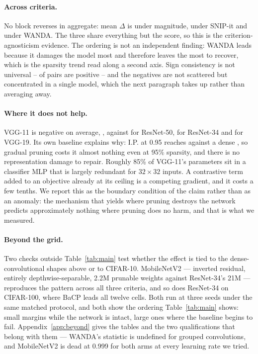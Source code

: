 \paragraph{Across criteria.}
No block reverses in aggregate: mean $\Delta$ is
 under magnitude,
 under SNIP-it and
 under WANDA. The three share everything
but the score, so this is the criterion-agnosticism evidence. The ordering is
not an independent finding: WANDA leads because it damages the model most and
therefore leaves the most to recover, which is the sparsity trend read along a
second axis. Sign consistency is not universal --
 of  pairs are
positive -- and the negatives are not scattered but concentrated in a single
model, which the next paragraph takes up rather than averaging away.

\paragraph{Where it does not help.}
VGG-11 is negative on average, , against
 for ResNet-50,
 for ResNet-34 and
 for VGG-19. Its own baseline explains why:
I.P. at 0.95 reaches  against a dense
, so gradual pruning costs it almost nothing even
at 95\% sparsity, and there is no representation damage to repair. Roughly
85\% of VGG-11's parameters sit in a classifier MLP that is largely redundant
for $32\times32$ inputs. A contrastive term added to an objective already at
its ceiling is a competing gradient, and it costs a few tenths. We report this
as the boundary condition of the claim rather than as an anomaly: the
mechanism that yields  where pruning
destroys the network predicts approximately nothing where pruning does no
harm, and that is what we measured.

\paragraph{Beyond the grid.}
Two checks outside Table~\ref{tab:main} test whether the effect is tied to the
dense-convolutional shapes above or to CIFAR-10. MobileNetV2 --- inverted
residual, entirely depthwise-separable, \num{2.2}M prunable weights against
ResNet-34's \num{21}M --- reproduces the pattern across all three criteria, and
so does ResNet-34 on CIFAR-100, where BaCP leads all twelve cells. Both run at
three seeds under the same matched protocol, and both show the ordering
Table~\ref{tab:main} shows: small margins while the network is intact, large
ones where the baseline begins to fail. Appendix~\ref{app:beyond} gives the
tables and the two qualifications that belong with them --- WANDA's statistic
is undefined for grouped convolutions, and MobileNetV2 is dead at 0.999 for
both arms at every learning rate we tried.





